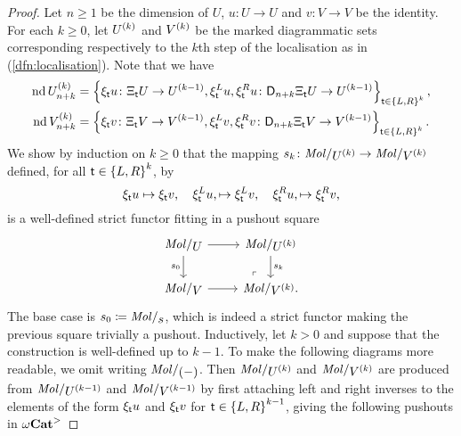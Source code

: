 \begin{proof}
    Let \( n \geq 1 \) be the dimension of \( U \), \( u \colon U \to U \) and \( v \colon V \to V \) be the identity.
    For each \( k \geq 0 \), let \( \order{k}{U} \) and \( \order{k}{V} \) be the marked diagrammatic sets corresponding respectively to the \( k \)\nbd th step of the localisation as in (\ref{dfn:localisation}).
    Note that we have
    \begin{align*}
        \nd \gr{n + k}{\order{k}{U}} &= \set{\hinv{\s}u \colon \hcyl{\s} U \to \order{k - 1}{U}, \hinv{\s}^Lu, \hinv{\s}^Ru \colon \dual{n + k}{\hcyl{\s} U} \to \order{k - 1}{U}}_{\s \in \set{L, R}^k},\\
        \nd \gr{n + k}{\order{k}{V}} &= \set{\hinv{\s}v \colon \hcyl{\s} V \to \order{k - 1}{V}, \hinv{\s}^Lv, \hinv{\s}^Rv \colon \dual{n + k}{\hcyl{\s} V} \to \order{k - 1}{V}}_{\s \in \set{L, R}^k}.
    \end{align*}
    We show by induction on \( k \geq 0 \) that the mapping \( s_k \colon \molecin{\order{k}{U}} \to \molecin{\order{k}{V}} \) defined, for all \( \s \in \set{L, R}^k \), by
    \begin{equation*}
        \hinv{\s}u \mapsto \hinv{\s}v,\quad \hinv{\s}^Lu, \mapsto \hinv{\s}^Lv,\quad \hinv{\s}^Ru, \mapsto \hinv{\s}^Rv,
    \end{equation*}
    is a well-defined strict functor fitting in a pushout square
    \begin{equation} \label{tik:inductive_square_subdivision_localisation}
        \begin{tikzcd}
            {\molecin U} & {\molecin{\order k U}} \\
            {\molecin V} & {\molecin {\order k V}.}
            \arrow[""{name=0, anchor=center, inner sep=0}, from=1-1, to=1-2]
            \arrow["{s_0}"', from=1-1, to=2-1]
            \arrow["{s_k}", from=1-2, to=2-2]
            \arrow[from=2-1, to=2-2]
            \arrow["\lrcorner"{anchor=center, pos=0.125, rotate=180}, draw=none, from=2-2, to=0]
        \end{tikzcd}
    \end{equation}
    The base case is \( s_0 \eqdef \molecin{s} \), which is indeed a strict functor making the previous square trivially a pushout.
    Inductively, let \( k > 0 \) and suppose that the construction is well-defined up to \( k - 1 \).
    To make the following diagrams more readable, we omit writing \( \molecin{(-)} \).
    Then \( {\molecin{\order k U}} \) and \( {\molecin{\order k V}} \) are produced from \( {\molecin{\order {k - 1} U}} \) and \( {\molecin{\order {k - 1} V}} \) by first attaching left and right inverses to the elements of the form \( \hinv{\s}u \) and \( \hinv{\s}v \) for \( \s \in \set{L, R}^{k - 1} \), giving the following pushouts in \( \somegaCat \)

\end{proof}
